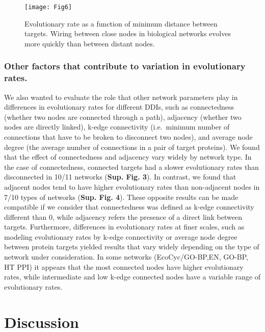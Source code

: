 \documentclass[
]{article}
\begin{document}
\begin{figure}
\texttt{[image: Fig6]} \caption{Evolutionary rate as a function of  minimum distance between targets. Wiring between close nodes in biological networks evolves more quickly than between distant nodes.}\label{fig:fig6}
\end{figure}

\hypertarget{other-factors-that-contribute-to-variation-in-evolutionary-rates.}{%
\subsubsection{Other factors that contribute to variation in evolutionary rates.}\label{other-factors-that-contribute-to-variation-in-evolutionary-rates.}}

We also wanted to evaluate the role that other network parameters play in differences in evolutionary rates for different DDIs, such as connectedness (whether two nodes are connected through a path), adjacency (whether two nodes are directly linked), k-edge connectivity (i.e.~minimum number of connections that have to be broken to disconnect two nodes), and average node degree (the average number of connections in a pair of target proteins). We found that the effect of connectedness and adjacency vary widely by network type. In the case of connectedness, connected targets had a slower evolutionary rates than disconnected in 10/11 networks (\textbf{Sup. Fig. 3}). In contrast, we found that adjacent nodes tend to have higher evolutionary rates than non-adjacent nodes in 7/10 types of networks (\textbf{Sup. Fig. 4}). These opposite results can be made compatible if we consider that connectedness was defined as k-edge connectivity different than 0, while adjacency refers the presence of a direct link between targets. Furthermore, differences in evolutionary rates at finer scales, such as modeling evolutionary rates by k-edge connectivity or average node degree between protein targets yielded results that vary widely depending on the type of network under consideration. In some networks (EcoCyc/GO-BP,EN, GO-BP, HT PPI) it appears that the most connected nodes have higher evolutionary rates, while intermediate and low k-edge connected nodes have a variable range of evolutionary rates.

\hypertarget{discussion}{%
\section{Discussion}\label{discussion}}
\end{document}
